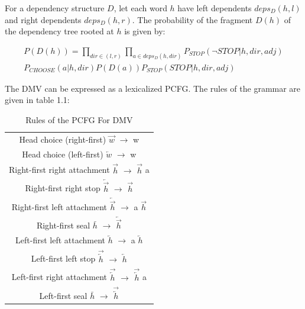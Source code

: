 \documentclass{book}
\begin{document}
For a dependency structure $D$, let each word $h$ have left dependents $deps_D(h, l)$ and right dependents $deps_D(h, r)$. The probability of the fragment $D(h)$ of the dependency tree rooted at $h$ is given by:

\begin{gather*}
    P(D(h)) = \prod\limits_{dir\in(l,r)} \prod\limits_{a\in deps_D(h,dir)} P_{STOP} (\neg STOP | h, dir, adj) \\
    P_{CHOOSE}(a|h, dir) P(D(a)) P_{STOP}(STOP | h, dir, adj)
\end{gather*}

The DMV can be expressed as a lexicalized PCFG. The rules of the grammar are given in table 1.1:


\begin{table}[htbp]
\onehalfspacing
\begin{center}
\begin{tabular}{|c|}
 \hline
  Head choice (right-first)   $\overrightarrow{w}$  $\rightarrow$ w \\
  Head choice (left-first)   $\overleftarrow{w}$   $\rightarrow$ w \\

  Right-first right attachment $\overrightarrow{h}$  $\rightarrow$ $\overrightarrow{h}$ a \\
  Right-first right stop $\overleftarrow{\overrightarrow{h}}$ $\rightarrow$ $\overrightarrow{h}$ \\
  Right-first left attachment $\overleftarrow{\overrightarrow{h}}$ $\rightarrow$ a $\overrightarrow{h}$ \\
  Right-first seal $\bar{h}$ $\rightarrow$ $\overleftarrow{\overrightarrow{h}}$ \\

  Left-first left attachment  $\overleftarrow{h}$ $\rightarrow$  a $\overleftarrow{h}$ \\
  Left-first left stop  $\overrightarrow{\overleftarrow{h}}$ $\rightarrow$ $\overleftarrow{h}$ \\
  Left-first right attachment $\overrightarrow{\overleftarrow{h}}$ $\rightarrow$ $\overrightarrow{\overleftarrow{h}}$ a \\
  Left-first seal $\bar{h}$ $\rightarrow$ $\overrightarrow{\overleftarrow{h}}$ \\
 \hline
\end{tabular}
\end{center}
\caption{Rules of the PCFG For DMV}
\end{table}
\end{document}

